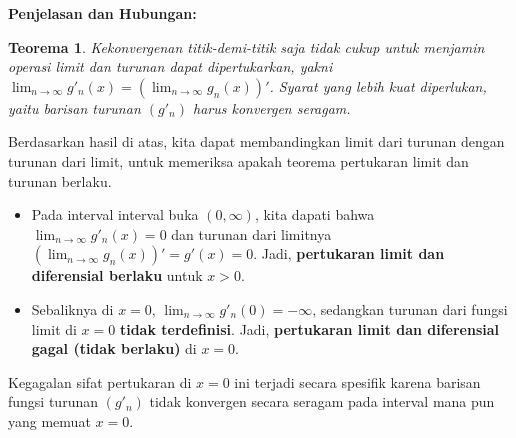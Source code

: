 \documentclass[12pt,openany,a4paper]{article}
\newtheorem*{teorema}{Teorema}
\begin{document}
\begin{enumerate}
    \textbf{Penjelasan dan Hubungan:}
    \begin{teorema}
        Kekonvergenan titik-demi-titik saja tidak cukup untuk menjamin operasi limit dan turunan dapat dipertukarkan, yakni $\lim_{n \to \infty} g'_n(x) = \left(\lim_{n \to \infty} g_n(x)\right)'$. Syarat yang lebih kuat diperlukan, yaitu barisan turunan $(g'_n)$ harus konvergen seragam.
    \end{teorema}
    Berdasarkan hasil di atas, kita dapat membandingkan limit dari turunan dengan turunan dari limit, untuk memeriksa apakah teorema pertukaran limit dan turunan berlaku.
    \begin{itemize}
        \item Pada interval interval buka $(0, \infty)$, kita dapati bahwa $\lim_{n \to \infty} g'_n(x) = 0$ dan turunan dari limitnya $\left( \lim_{n \to \infty} g_n(x) \right)' = g'(x) = 0$. Jadi, \textbf{pertukaran limit dan diferensial berlaku} untuk $x > 0$.
        \item Sebaliknya di $x = 0$, $\lim_{n \to \infty} g'_n(0) = -\infty$, sedangkan turunan dari fungsi limit di $x=0$ \textbf{tidak terdefinisi}. Jadi, \textbf{pertukaran limit dan diferensial gagal (tidak berlaku)} di $x=0$.
    \end{itemize}
    Kegagalan sifat pertukaran di $x=0$ ini terjadi secara spesifik karena barisan fungsi turunan $(g'_n)$ tidak konvergen secara seragam pada interval mana pun yang memuat $x=0$.
\end{enumerate}
\end{document}
